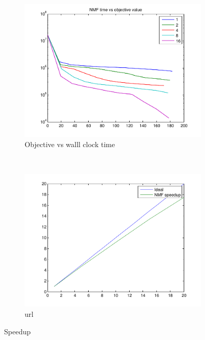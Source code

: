 \begin{figure}[!h]
        \centering
       \begin{subfigure}[b]{0.4\textwidth}
                \includegraphics[width=\textwidth]{./figs/NMF_plot}
                \caption{Objective vs walll clock time}
        \end{subfigure}
        ~~
        \begin{subfigure}[b]{0.4\textwidth}
                \includegraphics[width=\textwidth]{./figs/speedup}
                \caption{url}
        \end{subfigure} 
        \caption{Speedup}\label{fig:NMF_speedup}
\end{figure}


